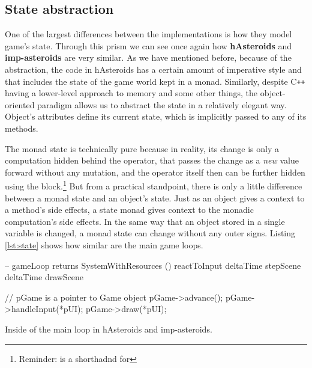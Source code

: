 \documentclass[
  digital, %
  color,   %
  table,   %
  oneside, %
  lof,     %
  lot,     %
]{fithesis3}
\newcommand{\cpp}{C\nolinebreak\texttt{+}\nolinebreak\texttt{+}}
\begin{document}
{\subsection{State abstraction}
One of the largest differences between the implementations is how they model game's state.
Through this prism we can see once again how \textbf{hAsteroids} and \textbf{imp-asteroids}
are very similar. As we have mentioned before, because of the abstraction,
the code in hAsteroids has a certain amount of imperative style and that includes the state
of the game world kept in a monad. Similarly, despite \cpp{} having a lower-level
approach to memory and some other things, the object-oriented paradigm allows us
to abstract the state in a relatively elegant way. Object's attributes
define its current state, which is implicitly passed to any of its methods.

The monad state is technically pure because in reality,
its change is only a computation hidden behind the \inlinehs{>>=} operator,
that passes the change as a \emph{new} value forward without any mutation,
and the operator itself then can be further hidden using the  block.\footnote{
Reminder:  is a shorthadnd for
}
But from a practical standpoint, there is only a little difference between a monad state
and an object's state. Just as an object gives a context to a method's side effects,
a state monad gives context to the monadic computation's side effects.
In the same way that an object stored in a single variable is changed, a monad state
can change without any outer signs. Listing \ref{lst:state} shows how similar
are the main game loops.

\begin{listing}
\begin{haskell}
-- gameLoop returns SystemWithResources ()
reactToInput deltaTime
stepScene deltaTime
drawScene
\end{haskell}
\begin{cppblock}
// pGame is a pointer to Game object
pGame->advance();
pGame->handleInput(*pUI);
pGame->draw(*pUI);
\end{cppblock}
\caption{Inside of the main loop in hAsteroids and imp-asteroids.}
\label{lst:state}
\end{listing}

}
\end{document}
